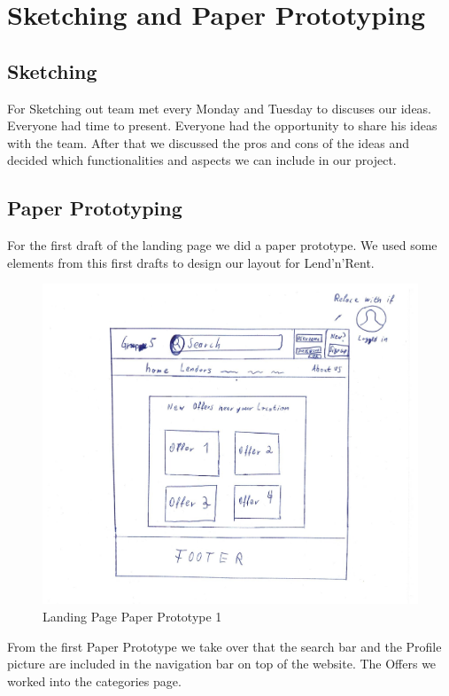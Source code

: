 \section{Sketching and Paper Prototyping}

    \subsection{Sketching}
        For Sketching out team met every Monday and Tuesday to discuses our ideas. Everyone had time to present. Everyone had the opportunity to share his ideas with the team. After that we discussed the pros and cons of the ideas and decided which functionalities and aspects we can include in our project.
        
    \subsection{Paper Prototyping}
        For the first draft of the landing page we did a paper prototype. We used some elements from this first drafts to design our layout for Lend'n'Rent.
        
        	\begin{figure}[H]
				\centering
				\includegraphics[width=\linewidth]{abb/6_Sketching and Paper Prototyping/Homepage1.png}
				\caption{Landing Page Paper Prototype 1}
				\label{fig:Homepage1}
			\end{figure}
			
			\noindent
			From the first Paper Prototype we take over that the search bar and the Profile picture are included in the navigation bar on top of the website. The Offers we worked into the categories page. 
			
